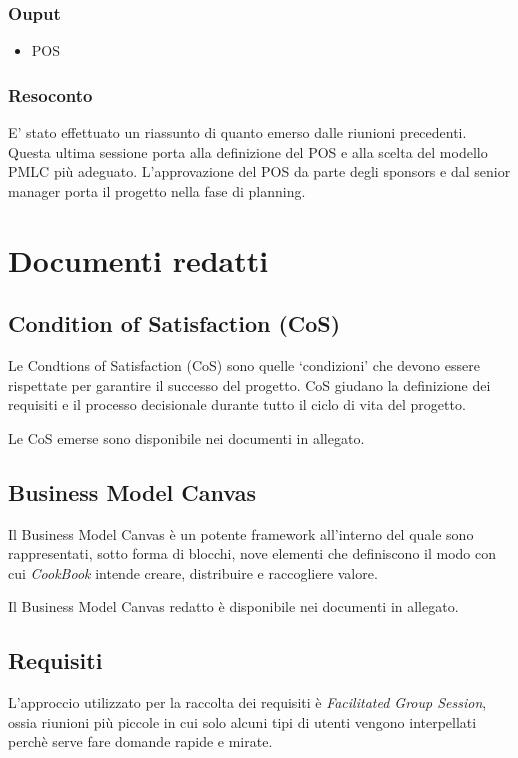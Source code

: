 \subsubsection*{Ouput}
\begin{itemize}
    \item POS
\end{itemize} 
\subsubsection*{Resoconto}
E' stato effettuato un riassunto di quanto emerso dalle riunioni precedenti.
Questa ultima sessione porta alla definizione del POS e alla scelta del modello PMLC più adeguato. 
L'approvazione del POS da parte degli sponsors e dal senior manager porta il progetto nella fase di planning.


\section{Documenti redatti}

\subsection{Condition of Satisfaction (CoS)}

Le Condtions of Satisfaction (CoS) sono quelle `condizioni' che devono essere rispettate 
per garantire il successo del progetto. CoS giudano la definizione dei requisiti e il processo decisionale
durante tutto il ciclo di vita del progetto.

Le CoS emerse sono disponibile nei documenti in allegato.

\subsection{Business Model Canvas}
Il Business Model Canvas è un potente framework all'interno del quale sono rappresentati, sotto
forma di blocchi, nove elementi che definiscono il modo con cui \textit{CookBook} intende creare, distribuire
e raccogliere valore.

Il Business Model Canvas redatto è disponibile nei documenti in allegato.

\subsection{Requisiti}

L'approccio utilizzato per la raccolta dei requisiti è \textit{Facilitated Group Session}, ossia riunioni più piccole in cui solo alcuni tipi di utenti 
vengono interpellati perchè serve fare domande rapide e mirate.

